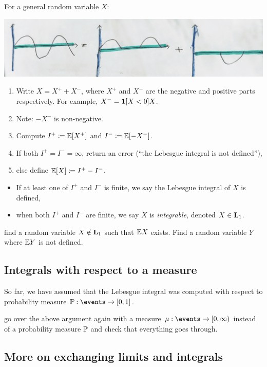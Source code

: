 \documentclass{article}
\begin{document}
For a general random variable $X$:
\begin{center}
	\includegraphics[width=0.8\linewidth]{figures/decomposition}
\end{center} 
\begin{enumerate}
  \item Write $X = X^{+} + X^{-}$, where $X^{+}$ and $X^{-}$ are the negative and positive parts respectively. For example, $X^{-} = \1[X < 0] X$. 
  \item Note: $-X^{-}$ is non-negative.
  \item Compute $I^{+} \defeq \E[X^+]$ and $I^{-} \defeq \E[-X^-]$.
  \item If both $I^{+} = I^- = \infty$, return an error (``the Lebesgue integral is not defined''),
  \item else define $\E[X] \defeq I^{+} - I^{-}$.
\end{enumerate}

\begin{itemize} 
  \item If at least one of $I^{+}$ and $I^-$ is finite, we say the Lebesgue integral of $X$ is defined,
  \item when both $I^{+}$ and $I^-$ are finite, we say $X$ is \emph{integrable}, denoted $X \in \L_1$. 
\end{itemize}

 find a random variable $X \notin \L_1$ such that $\E X$ exists. Find a random variable $Y$ where $\E Y$ is not defined. 


\subsection{Integrals with respect to a measure}

So far, we have assumed that the Lebesgue integral was computed with respect to probability measure $\P : \events \to [0, 1]$. 

 go over the above argument again with a measure $\mu : \events \to [0, \infty)$ instead of a probability measure $\P$ and check that everything goes through.



\subsection{More on exchanging limits and integrals}\label{sec:exchange-lim}
\end{document}
